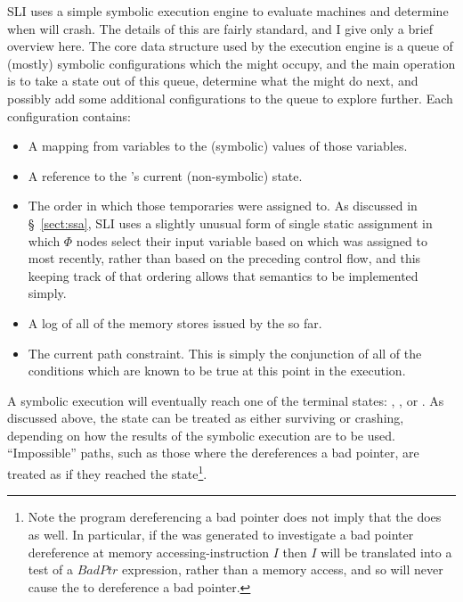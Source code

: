 
SLI uses a simple symbolic execution engine to evaluate machines and
determine when {\StateMachines} will crash.  The details of this are
fairly standard, and I give only a brief overview
here.  The core data structure
used by the execution engine is a queue of (mostly) symbolic
configurations which the {\StateMachine} might occupy, and the main
operation is to take a state out of this queue, determine what the
\StateMachine might do next, and possibly add some additional
configurations to the queue to explore further.  Each configuration
contains:

\begin{itemize}
\item
  A mapping from {\StateMachine} variables to the (symbolic) values of
  those variables.
\item
  A reference to the {\StateMachine}'s current (non-symbolic) state.
\item
  The order in which those temporaries were assigned to.  As discussed
  in \S~\ref{sect:ssa}, SLI uses a slightly unusual form of single
  static assignment in which $\Phi$ nodes select their input variable
  based on which was assigned to most recently, rather than based on
  the preceding control flow, and this keeping track of that ordering
  allows that semantics to be implemented simply.
\item
  A log of all of the memory stores issued by the \StateMachine so far.
\item
  The current path constraint.  This is simply the conjunction of all
  of the conditions which are known to be true at this point in the
  execution.
\end{itemize}

A symbolic execution will eventually reach one of the {\StateMachine}
terminal states: , , or .
As discussed above, the  state can be treated as
either surviving or crashing, depending on how the results of the
symbolic execution are to be used.  ``Impossible'' paths, such as
those where the {\StateMachine} dereferences a bad pointer, are
treated as if they reached the  state\footnote{Note
  the program dereferencing a bad pointer does not imply that the
  {\StateMachine} does as well.  In particular, if the {\StateMachine}
  was generated to investigate a bad pointer dereference at memory
  accessing-instruction $I$ then $I$ will be translated into a test of
  a $BadPtr$ expression, rather than a memory access, and so will
  never cause the {\StateMachine} to dereference a bad pointer.}.

